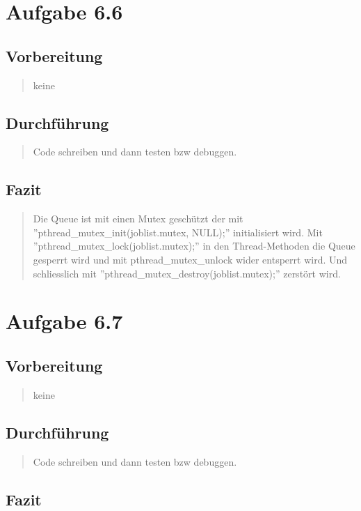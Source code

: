 \section{Aufgabe 6.6}
\subsection{Vorbereitung}
\begin{quote}
	keine\\
\end{quote}
\subsection{Durchführung}
\begin{quote}
	Code schreiben und dann testen bzw debuggen.\\
\end{quote}
\subsection{Fazit}
\begin{quote}
	Die Queue ist mit einen Mutex gesch\"utzt der mit ''pthread\_mutex\_init(joblist.mutex, NULL);'' initialisiert wird. Mit ''pthread\_mutex\_lock(joblist.mutex);'' in den Thread-Methoden die Queue gesperrt wird und mit pthread\_mutex\_unlock wider entsperrt wird. Und schliesslich mit ''pthread\_mutex\_destroy(joblist.mutex);'' zerst\"ort wird.\\
\end{quote}

\section{Aufgabe 6.7}
\subsection{Vorbereitung}
\begin{quote}
	keine
\end{quote}
\subsection{Durchführung}
\begin{quote}
	Code schreiben und dann testen bzw debuggen.
\end{quote}
\subsection{Fazit}
\begin{quote}
	
\end{quote}


